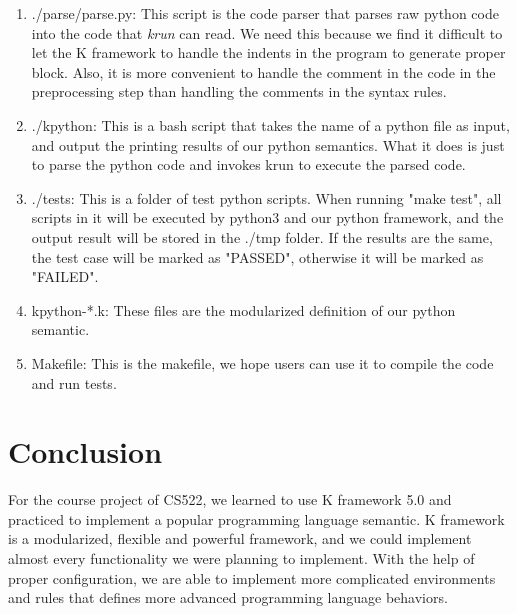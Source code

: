 \documentclass[a4paper]{article}
\begin{document}
\begin{enumerate}
    \item ./parse/parse.py: This script is the code parser that parses raw python code into the code that \emph{krun} can read. We need this because we find it difficult to let the K framework to handle the indents in the program to generate proper block. Also, it is more convenient to handle the comment in the code in the preprocessing step than handling the comments in the syntax rules.
    \item ./kpython: This is a bash script that takes the name of a python file as input, and output the printing results of our python semantics. What it does is just to parse the python code and invokes krun to execute the parsed code.
    \item ./tests: This is a folder of test python scripts. When running "make test", all scripts in it will be executed by python3 and our python framework, and the output result will be stored in the ./tmp folder. If the results are the same, the test case will be marked as "PASSED", otherwise it will be marked as "FAILED".
    \item kpython-*.k: These files are the modularized definition of our python semantic.
    \item Makefile: This is the makefile, we hope users can use it to compile the code and run tests.
\end{enumerate}


\section{Conclusion}

For the course project of CS522, we learned to use K framework 5.0 and practiced to implement a popular programming language semantic. K framework is a modularized, flexible and powerful framework, and we could implement almost every functionality we were planning to implement. With the help of proper configuration, we are able to implement more complicated environments and rules that defines more advanced programming language behaviors. 
\end{document}
